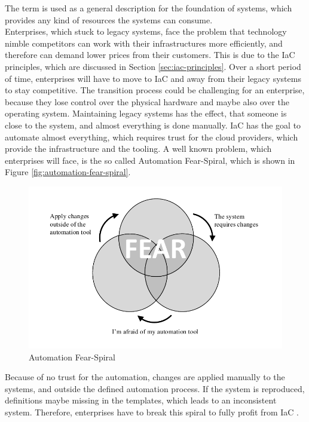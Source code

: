 The term  is used as a general description for the foundation of systems, which provides any kind of resources the systems can consume. \\

Enterprises, which stuck to legacy systems, face the problem that technology nimble competitors can work with their infrastructures more efficiently, and therefore can demand lower prices from their customers. This is due to the IaC principles, which are discussed in Section \vref{sec:iac-principles}. Over a short period of time, enterprises will have to move to IaC and away from their legacy systems to stay competitive. The transition process could be challenging for an enterprise, because they lose control over the physical hardware and maybe also over the operating system. Maintaining legacy systems has the effect, that someone is close to the system, and almost everything is done manually. IaC has the goal to automate almost everything, which requires trust for the cloud providers, which provide the infrastructure and the tooling. A well known problem, which enterprises will face, is the so called Automation Fear-Spiral, which is shown in Figure \vref{fig:automation-fear-spiral}.

\begin{figure}[htbp]
	\centering
	\includegraphics[scale=1]{images/automation-fear-spiral.pdf}
	\caption{Automation Fear-Spiral}
	\label{fig:automation-fear-spiral}
\end{figure} 

Because of no trust for the automation, changes are applied manually to the systems, and outside the defined automation process. If the system is reproduced, definitions maybe missing in the templates, which leads to an inconsistent system. Therefore, enterprises have to break this spiral to fully profit from IaC \cite{Morris2016}. \\

